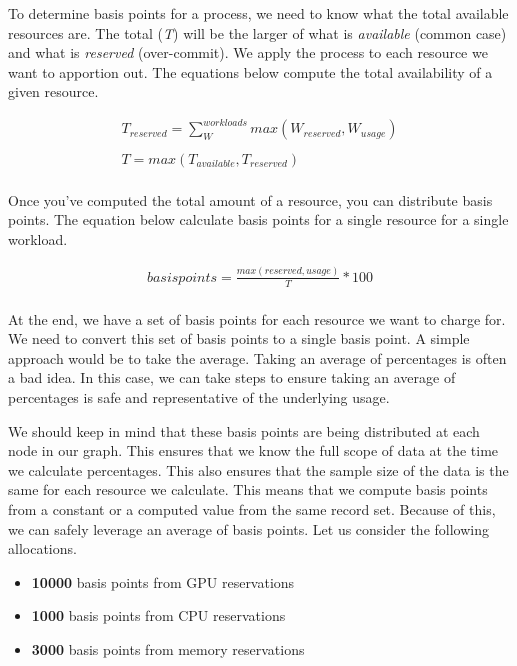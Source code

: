 \documentclass[10pt, a4paper, twocolumn]{article}
\begin{document}
    To determine basis points for a process, we need to know what the total available resources are.
    The total (\textit{T}) will be the larger of what is \textit{available} (common case) and what is \textit{reserved} (over-commit).
    We apply the process to each resource we want to apportion out.
    The equations below compute the total availability of a given resource.

    \begin{gather*}
      T_{reserved} = \sum^{workloads}_{W} max(W_{reserved}, W_{usage}) \\
      \\
      T = max(T_{available}, T_{reserved}) \\
    \end{gather*}

    Once you've computed the total amount of a resource, you can distribute basis points.
    The equation below calculate basis points for a single resource for a single workload.

    \begin{gather*}
      basispoints = \frac{max(reserved, usage)}{T} * 100 \\
    \end{gather*}

    At the end, we have a set of basis points for each resource we want to charge for.
    We need to convert this set of basis points to a single basis point.
    A simple approach would be to take the average.
    Taking an average of percentages is often a bad idea.
    In this case, we can take steps to ensure taking an average of percentages is safe and representative of the underlying usage.

    We should keep in mind that these basis points are being distributed at each node in our graph.
    This ensures that we know the full scope of data at the time we calculate percentages.
    This also ensures that the sample size of the data is the same for each resource we calculate.
    This means that we compute basis points from a constant or a computed value from the same record set.
    Because of this, we can safely leverage an average of basis points.
    Let us consider the following allocations.

    \begin{itemize}
      \item \textbf{10000} basis points from GPU reservations
      \item \textbf{1000} basis points from CPU reservations
      \item \textbf{3000} basis points from memory reservations
    \end{itemize}
\end{document}
